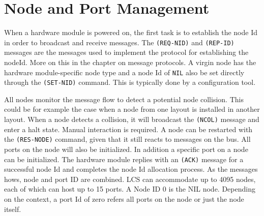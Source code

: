 \section{Node and Port Management}

When a hardware module is powered on, the first task is to establish the node Id in order to broadcast and receive messages. The \texttt{(REQ-NID)} and \texttt{(REP-ID)} messages are the messages used to implement the protocol for establishing the nodeId. More on this in the chapter on message protocols. A virgin node has the hardware module-specific node type and a node Id of \texttt{NIL} also be set directly through the \texttt{(SET-NID)} command. This is typically done by a configuration tool.

\begin{table}[ht!]
    \centering 
    \caption{Node Id Management}
\end{table}

All nodes monitor the message flow to detect a potential node collision. This could be for example the case when a node from one layout is installed in another layout. When a node detects a collision, it will broadcast the \texttt{(NCOL)} message and enter a halt state. Manual interaction is required. A node can be restarted with the \texttt{(RES-NODE)} command, given that it still reacts to messages on the bus. All ports on the node will also be initialized. In addition a specific port on a node can be initialized. The hardware module replies with an \texttt{(ACK)} message for a successful node Id and completes the node Id allocation process. As the messages hows, node and port ID are combined. LCS can accommodate up to 4095 nodes, each of which can host up to 15 ports. A Node ID 0 is the NIL node. Depending on the context, a port Id of zero refers all ports on the node or just the node itself.

